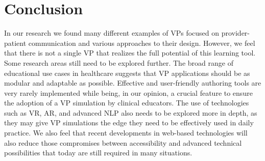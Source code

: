 \section{Conclusion}
\label{sec:conclusion}

In our research we found many different examples of VPs focused on provider-patient communication and various approaches to their design. However, we feel that there is not a single VP that realizes the full potential of this learning tool. Some research areas still need to be explored further. The broad range of educational use cases in healthcare suggests that VP applications should be as modular and adaptable as possible. Effective and user-friendly authoring tools are very rarely implemented while being, in our opinion, a crucial feature to ensure the adoption of a VP simulation by clinical educators. 
The use of technologies such as VR, AR, and advanced NLP also needs to be explored more in depth, as they may give VP simulations the edge they need to be effectively used in daily practice. We also feel that recent developments in web-based technologies will also reduce those compromises between accessibility and advanced technical possibilities that today are still required in many situations.



 
